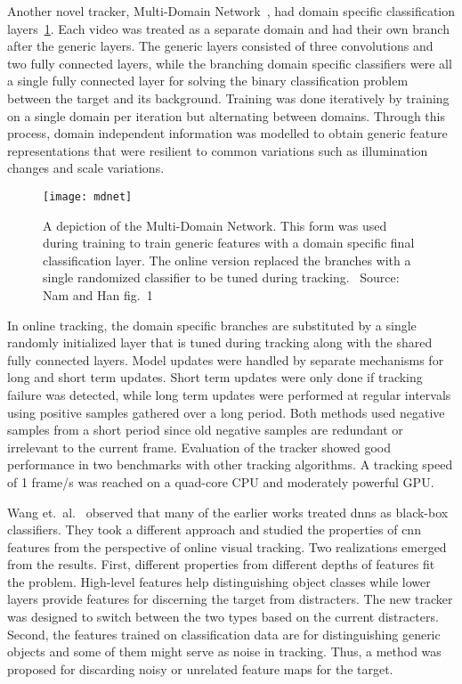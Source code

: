 Another novel tracker, Multi-Domain Network~\cite{MDNET}, had domain specific classification
layers~\ref{fig:mdnet}. Each video was treated as a separate domain and had their own branch after the
generic layers. The generic layers consisted of three convolutions and two fully connected
layers, while the branching domain specific classifiers were all a single fully connected
layer for solving the binary classification problem between the target and its background.
Training was done iteratively by training on a single domain per iteration but alternating
between domains. Through this process, domain independent information was modelled to
obtain generic feature representations that were resilient to common variations such as
illumination changes and scale variations.~\cite{MDNET}

\begin{figure}[H]
\centering
\texttt{[image: mdnet]}
\caption{A depiction of the Multi-Domain Network. This form was used during training
         to train generic features with a domain specific final classification layer.
         The online version replaced the branches with a single randomized classifier
         to be tuned during tracking.~\cite{MDNET} Source: Nam and Han fig.~1~\cite{MDNET}}\label{fig:mdnet}
\end{figure}

In online tracking, the domain specific branches are substituted by a single randomly
initialized layer that is tuned during tracking along with the shared fully connected
layers. Model updates were handled by separate mechanisms for long and short term updates.
Short term updates were only done if tracking failure was detected, while long term updates
were performed at regular intervals using positive samples gathered over a long period.
Both methods used negative samples from a short period since old negative samples are
redundant or irrelevant to the current frame. Evaluation of the tracker showed good
performance in two benchmarks with other tracking algorithms. A tracking speed of
1 frame/s was reached on a quad-core CPU and moderately powerful GPU.~\cite{MDNET}

Wang et.~al.~\cite{FCN_TRACK_2} observed that many of the earlier works treated \ac{dnn}s
as black-box classifiers. They took a different approach and studied the properties of
\ac{cnn} features from the perspective of online visual tracking. Two realizations
emerged from the results. First, different properties from different depths of features
fit the problem. High-level features help distinguishing object classes while lower
layers provide features for discerning the target from distracters. The new tracker was
designed to switch between the two types based on the current distracters. Second, the
features trained on classification data are for distinguishing generic objects and some
of them might serve as noise in tracking. Thus, a method was proposed for discarding
noisy or unrelated feature maps for the target.~\cite{FCN_TRACK_2}

